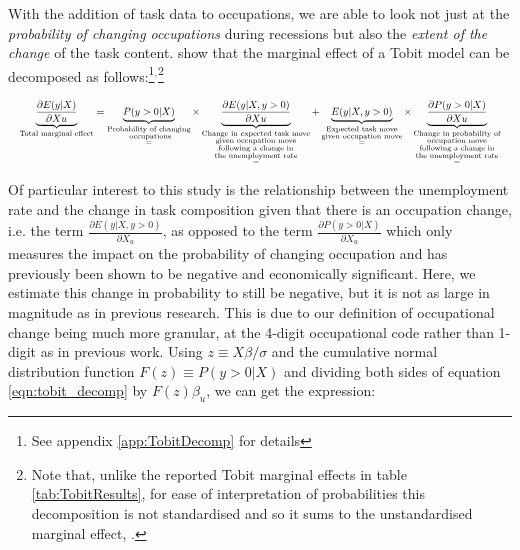 \documentclass[preprint,12pt,authoryear]{elsarticle}
\begin{document}
With the addition of task data to occupations, we are able to look not just at the \textit{probability of changing occupations} during recessions but also the \textit{extent of the change} of the task content. \cite{Mcdonald1980} show that the marginal effect of a Tobit model can be decomposed as follows:\footnote{See appendix \ref{app:TobitDecomp} for details}$^{,}$\footnote{Note that, unlike the reported Tobit marginal effects in table \ref{tab:TobitResults}, for ease of interpretation of probabilities this decomposition is not standardised and so it sums to the unstandardised marginal effect, \hspace{-1mm}.}


\begin{equation}
\resizebox{\columnwidth}{!}{$\displaystyle
	\label{eqn:tobit_decomp}
	\underbrace{\frac{\partial E(y| X)}{\partial Xu}}_{\text{Total marginal effect}} = \underbrace{P(y>0|X)}_{\substack{\text{Probability of changing} \\ \text{ occupations}\\=}}\times\underbrace{\frac{\partial E(y|X, y>0)}{\partial Xu}}_{\substack{\text{Change in expected task move} \\ \text{given occupation move} \\ \text{following a change in} \\ \text{the unemployment rate} \\ =}} + \underbrace{ E(y|X, y>0)}_{\substack{\text{Expected task move} \\ \text{given occupation move}\\=}}\times \underbrace{\frac{\partial P(y>0|X)}{\partial Xu}}_{\substack{\text{Change in probability of} \\ \text{occupation move}  \\ \text{following a change in} \\ \text{the unemployment rate}\\=}}
	$}
\end{equation}


\vspace{3mm}
Of particular interest to this study is the relationship between the unemployment rate and the change in task composition given that there is an occupation change, i.e. the term $\frac{\partial E(y|X, y>0)}{\partial X_{u}}$, as opposed to the term $\frac{\partial P(y>0|X)}{\partial X_u}$ which only measures the impact on the probability of changing occupation and has previously been shown to be negative and economically significant. Here, we estimate this change in probability to still be negative, but it is not as large in magnitude as in previous research. This is due to our definition of occupational change being much more granular, at the 4-digit occupational code rather than 1-digit as in previous work.
Using $z \equiv X\beta/\sigma$ and the cumulative normal distribution function $F(z)\equiv P(y>0|X)$ and dividing both sides of equation \ref{eqn:tobit_decomp} by $F(z)\beta_{u}$, we can get the expression:
\end{document}
